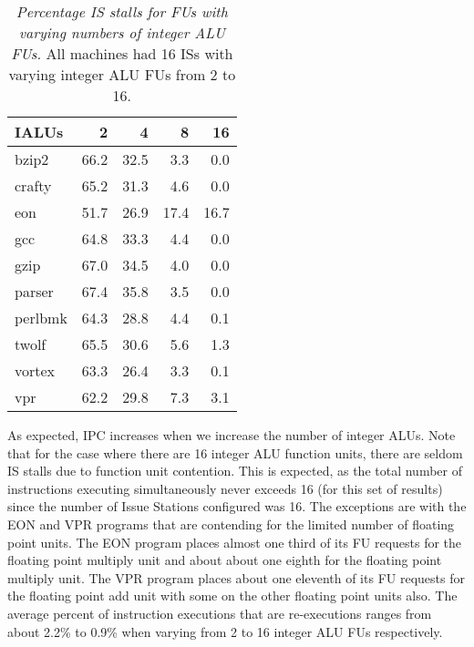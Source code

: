 \documentclass[10pt,dvips]{article}
\begin{document}
\begin{table}[p]
\begin{center}
\caption{{\em Percentage IS stalls for FUs
with varying numbers of integer ALU FUs.}
All machines had 16 ISs with varying integer ALU FUs from 2 to 16.}
\label{tab:nialu16waits}
\vspace{+0.1in}
\begin{tabular}{|l||r|r|r|r|}
\hline 
{IALUs}& 2 & 4 & 8 & 16 \\
\hline

\hline
bzip2&
66.2 & 32.5 & 3.3 & 0.0 \\

\hline
crafty&
65.2 & 31.3 & 4.6 & 0.0 \\

\hline
eon&
51.7 & 26.9 & 17.4 & 16.7 \\

\hline
gcc&
64.8 & 33.3 & 4.4 & 0.0 \\

\hline
gzip&
67.0 & 34.5 & 4.0 & 0.0 \\

\hline
parser&
67.4 & 35.8 & 3.5 & 0.0 \\

\hline
perlbmk&
64.3 & 28.8 & 4.4 & 0.1 \\

\hline
twolf&
65.5 & 30.6 & 5.6 & 1.3 \\

\hline
vortex&
63.3 & 26.4 & 3.3 & 0.1 \\

\hline
vpr&
62.2 & 29.8 & 7.3 & 3.1 \\

\hline
\end{tabular}
\end{center}
\end{table}
%
As expected, IPC increases when we increase the
number of integer
ALUs.
Note that for the case where there are 16 integer ALU function
units, there are seldom IS stalls due to function
unit contention.  
This is expected, as the total number of instructions executing
simultaneously never exceeds 16 (for this set of results) since
the number of Issue Stations configured was 16.
The exceptions are with the EON and VPR programs
that are contending for the limited number of floating point units.
The EON program places almost one third of its FU requests
for the floating point multiply unit and about 
about one eighth for the floating point multiply unit.
The VPR program places about one eleventh of its FU requests
for the floating point add unit with some on the other
floating point units also.
The average percent of instruction executions that are re-executions
ranges from about 2.2\% to 0.9\% 
when varying from 2 to 16 integer ALU FUs respectively.
%
%
\end{document}
